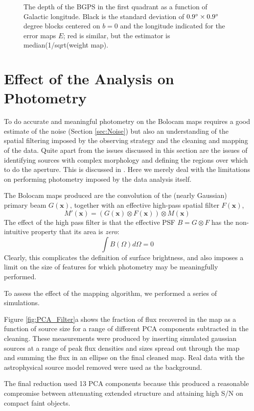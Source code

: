 \documentclass[12pt,preprint]{aastex}
\newcommand{\vect}[1]{\mathbf{#1}}
\newcommand{\xad}{\vect{x}}
\def\Figure#1#2#3#4{
\begin{figure}[htb]
\epsscale{#4}
\plotone{#1}
\caption{#2}
\label{#3}
\end{figure}
}
\begin{document}
\Figure{survey_depth}{The depth of the BGPS in the first quadrant as a
function of Galactic longitude.  Black is the standard deviation of
$0.9\mbox{$^\circ$} \times 0.9\mbox{$^\circ$}$ degree blocks centered on $b=0$ and the
longitude indicated for the error maps $E$; red is similar, but the
estimator is median(1/sqrt(weight map).}{fig:NoiseVsLongitude}{1.0}

\section{Effect of the Analysis on Photometry}
\label{sec:Photometry}

To do accurate and meaningful photometry on the Bolocam maps requires
a good estimate of the noise (Section \ref{sec:Noise}) but also an
understanding of the spatial filtering imposed by the observing
strategy and the cleaning and mapping of the data.  Quite apart from
the issues discussed in this section are the issues of identifying
sources with complex morphology and defining the regions over which to
do the aperture.  This is discussed in \citet{rosolowsky09}.  Here we
merely deal with the limitations on performing photometry imposed by
the data analysis itself.

The Bolocam maps produced are the convolution of the (nearly Gaussian)
primary beam $G(\xad)$, together with an effective high-pass
spatial filter $F(\xad)$,
\[
M'(\xad) = (G(\xad) \otimes F(\xad)) \otimes M(\xad)
\]
The effect of the high pass filter is that the effective PSF $B=G
\otimes F$ has the non-intuitive property that its area is {\em zero}:
\[
\int{B(\Omega) d\Omega} = 0
\]
Clearly, this complicates the definition of surface brightness, and
also imposes a limit on the size of features for which photometry may
be meaningfully performed.

To assess the effect of the mapping algorithm, we performed a series
of simulations.

Figure \ref{fig:PCA_Filter}a shows the fraction of flux recovered in
the map as a function of source size for a range of different PCA
components subtracted in the cleaning.  These measurements were
produced by inserting simulated gaussian sources at a range of peak
flux densities and sizes spread out through the map and summing the
flux in an ellipse on the final cleaned map. Real data with the
astrophysical source model removed were used as the background.

The final reduction used 13 PCA components because this produced a
reasonable compromise between attenuating extended structure and
attaining high S/N on compact faint objects.
\end{document}
